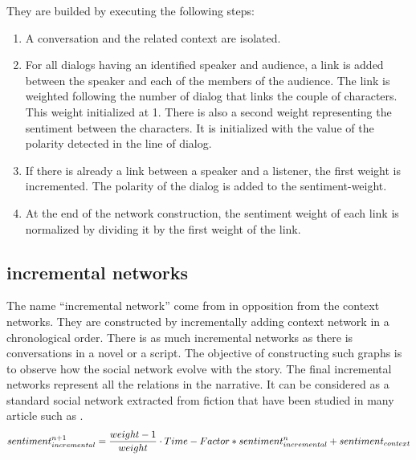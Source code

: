 \documentclass[a4paper, 12pt]{report}
\begin{document}
They are builded by executing the following steps:
\begin{enumerate}
\item A conversation and the related context are isolated.
\item For all dialogs having an identified speaker and audience, a link is added between the speaker and each of the members of the audience. The link is weighted following the number of dialog that links the couple of characters. This weight initialized at 1. There is also a second weight representing the sentiment between the characters. It is initialized with the value of the polarity detected in the line of dialog.
\item If there is already a link between a speaker and a listener, the first weight is incremented.  The polarity of the dialog is added to the sentiment-weight.
\item At the end of the network construction, the sentiment weight of each link is normalized by dividing it by the first weight of the link.
\end{enumerate}

\subsection{incremental networks}
The name ``incremental network'' come from \cite{original} in opposition from the context networks. They are constructed by incrementally adding context network in a chronological order. There is as much incremental networks as there is conversations in a novel or a script. The objective of constructing such graphs is to observe how the social network evolve with the story.
The final incremental networks represent all the relations in the narrative. It can be considered as a standard social network extracted from fiction that have been studied in many article such as \cite{agarwal-etal-2013-automatic, NER, character_country, movie, fiction, Dekker2018EvaluatingSN}.\\

\begin{equation}
\label{sentiment}
sentiment_{incremental}^{n+1} = \frac{weight - 1}{weight} \cdot Time-Factor * sentiment_{incremental}^{n} + sentiment_{context}\\
\end{equation}
\end{document}
